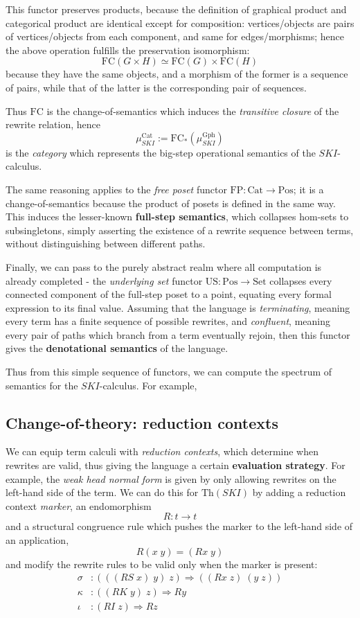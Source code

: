 \documentclass[a4paper,UKenglish]{article}
\theoremstyle{definition}
\newcommand{\Th}{\mathrm{Th}}
\newcommand{\Gph}{\mathrm{Gph}}
\newcommand{\Set}{\mathrm{Set}}
\newcommand{\Cat}{\mathrm{Cat}}
\newcommand{\Pos}{\mathrm{Pos}}
\newcommand{\FC}{\mathrm{FC}}
\newcommand{\FP}{\mathrm{FP}}
\newcommand{\US}{\mathrm{US}}
\begin{document}
This functor preserves products, because the definition of graphical product and categorical product are identical except for composition: vertices/objects are pairs of vertices/objects from each component, and same for edges/morphisms; hence the above operation fulfills the preservation isomorphism: $$\FC(G\times H) \simeq \FC(G)\times \FC(H)$$ because they have the same objects, and a morphism of the former is a sequence of pairs, while that of the latter is the corresponding pair of sequences.

Thus $\FC$ is the change-of-semantics which induces the \textit{transitive closure} of the rewrite relation, hence $$\mu_{SKI}^\Cat := \FC_*(\mu_{SKI}^\Gph)$$ is the \textit{category} which represents the big-step operational semantics of the $SKI$-calculus.

The same reasoning applies to the \textit{free poset} functor $\FP: \Cat \to \Pos$; it is a change-of-semantics because the product of posets is defined in the same way. This induces the lesser-known \textbf{full-step semantics}, which collapses hom-sets to subsingletons, simply asserting the existence of a rewrite sequence between terms, without distinguishing between different paths.

Finally, we can pass to the purely abstract realm where all computation is already completed - the \textit{underlying set} functor $\US: \Pos \to \Set$ collapses every connected component of the full-step poset to a point, equating every formal expression to its final value. Assuming that the language is \textit{terminating}, meaning every term has a finite sequence of possible rewrites, and \textit{confluent}, meaning every pair of paths which branch from a term eventually rejoin, then this functor gives the \textbf{denotational semantics} of the language.

Thus from this simple sequence of functors, we can compute the spectrum of semantics for the $SKI$-calculus. For example,


\subsection{Change-of-theory: reduction contexts}
We can equip term calculi with \textit{reduction contexts}, which determine when rewrites are valid, thus giving the language a certain \textbf{evaluation strategy}. For example, the \textit{weak head normal form} is given by only allowing rewrites on the left-hand side of the term. We can do this for $\Th(SKI)$ by adding a reduction context \textit{marker}, an endomorphism $$R: t \to t$$ and a structural congruence rule which pushes the marker to the left-hand side of an application, $$R(x\; y) = (Rx\; y)$$ and modify the rewrite rules to be valid only when the marker is present: 
\[\begin{array}{rl}
\sigma & :(((RS\; x)\; y)\; z) \Rightarrow ((Rx\; z)\; (y\; z))\\
\kappa & :((RK\; y)\; z) \Rightarrow Ry\\
\iota & :(RI\; z) \Rightarrow Rz\\
\end{array}
\]
\end{document}
